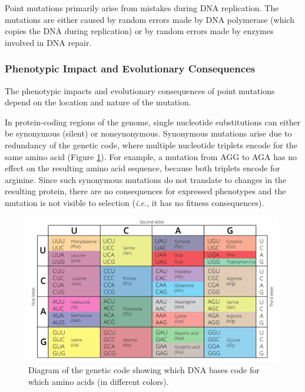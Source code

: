 \documentclass[
]{book}
\begin{document}
Point mutations primarily arise from mistakes during DNA replication. The mutations are either caused by random errors made by DNA polymerase (which copies the DNA during replication) or by random errors made by enzymes involved in DNA repair.

\hypertarget{phenotypic-impact-and-evolutionary-consequences}{%
\subsubsection*{Phenotypic Impact and Evolutionary Consequences}\label{phenotypic-impact-and-evolutionary-consequences}}

The phenotypic impacts and evolutionary consequences of point mutations depend on the location and nature of the mutation.

In protein-coding regions of the genome, single nucleotide substitutions can either be synonymous (silent) or nonsynonymous. Synonymous mutations arise due to redundancy of the genetic code, where multiple nucleotide triplets encode for the same amino acid (Figure \ref{fig:geneticcode}). For example, a mutation from AGG to AGA has no effect on the resulting amino acid sequence, because both triplets encode for arginine. Since such synonymous mutations do not translate to changes in the resulting protein, there are no consequences for expressed phenotypes and the mutation is not visible to selection (\emph{i.e.}, it has no fitness consequences).

\begin{figure}
\includegraphics[width=1\linewidth]{images/genetic_code} \caption{Diagram of the genetic code showing which DNA bases code for which amino acids (in different colors).}\label{fig:geneticcode}
\end{figure}
\end{document}
